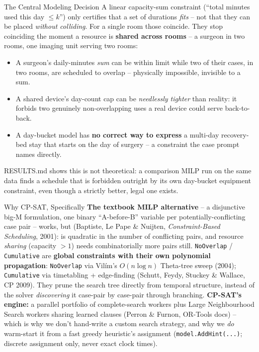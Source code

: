 \documentclass[aspectratio=169]{beamer}
\begin{document}
\begin{frame}{The Central Modeling Decision}
  A linear capacity-sum constraint (``total minutes used this day $\le k$'') only
  certifies that a set of durations \emph{fits} -- not that they can be placed
  \emph{without colliding}. For a single room those coincide. They stop coinciding the
  moment a resource is \textbf{shared across rooms} -- a surgeon in two rooms, one
  imaging unit serving two rooms:
  \begin{itemize}
    \item A surgeon's daily-minutes \emph{sum} can be within limit while two of their
      cases, in two rooms, are scheduled to overlap -- physically impossible, invisible
      to a sum.
    \item A shared device's day-count cap can be \emph{needlessly tighter} than
      reality: it forbids two genuinely non-overlapping uses a real device could serve
      back-to-back.
    \item A day-bucket model has \textbf{no correct way to express} a multi-day
      recovery-bed stay that starts on the day of surgery -- a constraint the case
      prompt names directly.
  \end{itemize}
  \vfill
  \footnotesize RESULTS.md shows this is not theoretical: a comparison MILP run on the
  same data finds a schedule that is forbidden outright by its own day-bucket
  equipment constraint, even though a strictly better, legal one exists.
\end{frame}

\begin{frame}{Why CP-SAT, Specifically}
  \textbf{The textbook MILP alternative} -- a disjunctive big-M formulation, one binary
  ``A-before-B'' variable per potentially-conflicting case pair -- works, but
  (Baptiste, Le Pape \& Nuijten, \emph{Constraint-Based Scheduling}, 2001):
  is quadratic in the number of conflicting pairs, and resource \emph{sharing}
  (capacity $>1$) needs combinatorially more pairs still.
  \vfill
  \texttt{NoOverlap} / \texttt{Cumulative} are \textbf{global constraints with their
  own polynomial propagation}: \texttt{NoOverlap} via Vil\'im's $O(n\log n)$
  Theta-tree sweep (2004); \texttt{Cumulative} via timetabling + edge-finding (Schutt,
  Feydy, Stuckey \& Wallace, CP 2009). They prune the search tree directly from
  temporal structure, instead of the solver \emph{discovering} it case-pair by
  case-pair through branching.
  \vfill
  \textbf{CP-SAT's engine:} a parallel portfolio of complete-search workers plus Large
  Neighbourhood Search workers sharing learned clauses (Perron \& Furnon, OR-Tools
  docs) -- which is why we don't hand-write a custom search strategy, and why we
  \emph{do} warm-start it from a fast greedy heuristic's assignment
  (\texttt{model.AddHint(...)}; discrete assignment only, never exact clock times).
\end{frame}
\end{document}
